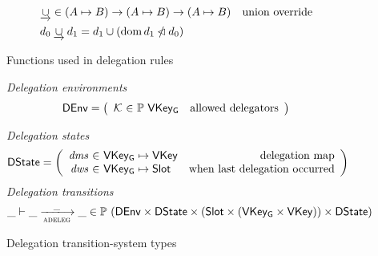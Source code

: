 \begin{figure}[htb]
  \begin{align*}
    & \mathbin{\underrightarrow\cup} \in (A \mapsto B) \to (A \mapsto B) \to (A \mapsto B)
    & \text{union override}\\
    & d_0 \mathbin{\underrightarrow\cup} d_1 = d_1 \cup (\operatorname{dom} d_1 \mathbin{\slashed{\lhd}} d_0)
  \end{align*}
  \caption{Functions used in delegation rules}
  \label{fig:funcs:delegation}
\end{figure}

\begin{figure}[htb]
  \emph{Delegation environments}
  \begin{equation*}
    \DEnv =
    \left(
      \begin{array}{r@{~\in~}lr}
        \mathcal{K} & \powerset{\VKeyGen} & \text{allowed delegators}
      \end{array}
    \right)
  \end{equation*}

  \emph{Delegation states}
  \begin{align*}
    & \DState
      = \left(
        \begin{array}{r@{~\in~}lr}
          \var{dms} & \VKeyGen \mapsto \VKey & \text{delegation map}\\
          \var{dws} & \VKeyGen \mapsto \Slot & \text{when last delegation occurred}\\
        \end{array}\right)
  \end{align*}
  \emph{Delegation transitions}
  \begin{equation*}
    \_ \vdash \_ \trans{adeleg}{\_} \_ \in
    \powerset (\DEnv \times \DState \times (\Slot \times (\VKeyGen \times \VKey)) \times \DState)
    \end{equation*}
  \caption{Delegation transition-system types}
  \label{fig:ts-types:delegation}
\end{figure}

